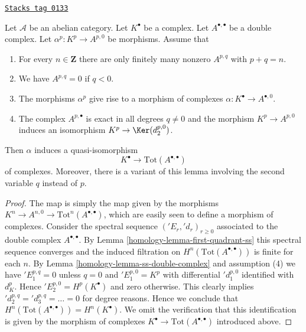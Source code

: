\begin{lemma}
\label{homology-lemma-double-complex-gives-resolution}
\href{https://stacks.math.columbia.edu/tag/0133}{\texttt{Stacks tag 0133}}

Let $\mathcal{A}$ be an abelian category.
Let $K^\bullet$ be a complex.
Let $A^{\bullet, \bullet}$ be a double complex.
Let $\alpha^p : K^p \to A^{p, 0}$ be morphisms.
Assume that
\begin{enumerate}
\item For every $n \in \mathbf{Z}$ there are only finitely many nonzero
$A^{p, q}$ with $p + q = n$.
\item We have $A^{p, q} = 0$ if $q < 0$.
\item The morphisms $\alpha^p$ give rise to a morphism
of complexes $\alpha : K^\bullet \to A^{\bullet, 0}$.
\item The complex $A^{p, \bullet}$ is exact in all degrees
$q \not = 0$ and the morphism $K^p \to A^{p, 0}$ induces
an isomorphism $K^p \to \Ker(d_2^{p, 0})$.
\end{enumerate}
Then $\alpha$ induces a quasi-isomorphism
$$
K^\bullet \longrightarrow \text{Tot}(A^{\bullet, \bullet})
$$
of complexes.
Moreover, there is a variant of this lemma involving the second
variable $q$ instead of $p$.
\end{lemma}

\begin{proof}

The map is simply the map given by the morphisms
$K^n \to A^{n, 0} \to \text{Tot}^n(A^{\bullet, \bullet})$,
which are easily seen to define a morphism of complexes.
Consider the spectral sequence $({}'E_r, {}'d_r)_{r \geq 0}$
associated to the double complex $A^{\bullet, \bullet}$.
By Lemma \ref{homology-lemma-first-quadrant-ss} this spectral sequence converges
and the induced filtration on $H^n(\text{Tot}(A^{\bullet, \bullet}))$
is finite for each $n$.
By Lemma \ref{homology-lemma-ss-double-complex} and assumption (4) we have
${}'E_1^{p, q} = 0$ unless $q = 0$ and $'E_1^{p, 0} = K^p$
with differential ${}'d_1^{p, 0}$ identified with $d_K^p$.
Hence ${}'E_2^{p, 0} = H^p(K^\bullet)$ and zero otherwise.
This clearly implies ${}'d_2^{p, q} = {}'d_3^{p, q} = \ldots = 0$
for degree reasons. Hence we conclude that
$H^n(\text{Tot}(A^{\bullet, \bullet})) = H^n(K^\bullet)$.
We omit the verification that this identification is given by the
morphism of complexes $K^\bullet \to \text{Tot}(A^{\bullet, \bullet})$
introduced above.
\end{proof}

